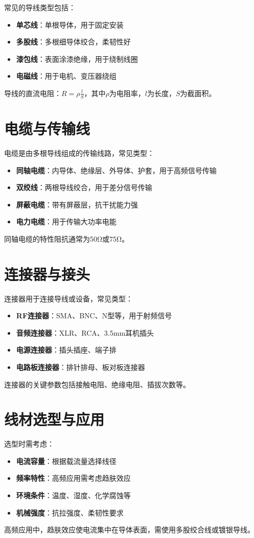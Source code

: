 常见的导线类型包括：

\begin{itemize}
    \item \textbf{单芯线}：单根导体，用于固定安装
    \item \textbf{多股线}：多根细导体绞合，柔韧性好
    \item \textbf{漆包线}：表面涂漆绝缘，用于绕制线圈
    \item \textbf{电磁线}：用于电机、变压器绕组
\end{itemize}

导线的直流电阻：$R = \rho\frac{l}{S}$，其中$\rho$为电阻率，$l$为长度，$S$为截面积。

\section{电缆与传输线}
\label{sec:cables_transmission_lines}

电缆是由多根导线组成的传输线路，常见类型：

\begin{itemize}
    \item \textbf{同轴电缆}：内导体、绝缘层、外导体、护套，用于高频信号传输
    \item \textbf{双绞线}：两根导线绞合，用于差分信号传输
    \item \textbf{屏蔽电缆}：带有屏蔽层，抗干扰能力强
    \item \textbf{电力电缆}：用于传输大功率电能
\end{itemize}

同轴电缆的特性阻抗通常为50Ω或75Ω。

\section{连接器与接头}
\label{sec:connectors}

连接器用于连接导线或设备，常见类型：

\begin{itemize}
    \item \textbf{RF连接器}：SMA、BNC、N型等，用于射频信号
    \item \textbf{音频连接器}：XLR、RCA、3.5mm耳机插头
    \item \textbf{电源连接器}：插头插座、端子排
    \item \textbf{电路板连接器}：排针排母、板对板连接器
\end{itemize}

连接器的关键参数包括接触电阻、绝缘电阻、插拔次数等。

\section{线材选型与应用}
\label{sec:wiring_selection}

选型时需考虑：

\begin{itemize}
    \item \textbf{电流容量}：根据载流量选择线径
    \item \textbf{频率特性}：高频应用需考虑趋肤效应
    \item \textbf{环境条件}：温度、湿度、化学腐蚀等
    \item \textbf{机械强度}：抗拉强度、柔韧性要求
\end{itemize}

高频应用中，趋肤效应使电流集中在导体表面，需使用多股绞合线或镀银导线。
